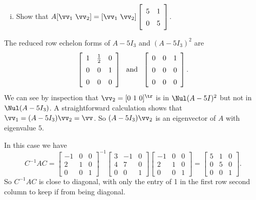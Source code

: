 \begin{pa}
\begin{enumerate}[i.]
	\item Show that $A[\vv_1 \ \vv_2] = [\vv_1 \ \vv_2] \left[ \begin{array}{cc} 5&1 \\ 0&5   \end{array} \right]$.
	
	\end{enumerate}
	

\ea

\end{pa}

\ActivitySolution
\ba
\item The reduced row echelon forms of $A - 5I_3$ and $(A-5I_3)^2$ are 
\[\left[\renewcommand{\arraystretch}{1.4} \begin{array}{ccc} 1&\frac{1}{2}&0 \\ 0&0&1 \\ 0&0&0 \end{array} \right] \ \text{ and } \ \left[ \begin{array}{ccc} 0&0&1 \\ 0&0&0 \\ 0&0&0 \end{array} \right].\]
We can see by inspection that $\vv_2 = [0 \ 1 \ 0]^{\tr}$ is in $\Nul (A-5 I)^2$ but not in $\Nul (A-5I_3)$. A straightforward calculation shows that $\vv_1 = (A-5I_3) \vv_2 = \vv$.  So $(A-5I_3) \vv_2$ is an eigenvector of $A$ with eigenvalue $5$. 

\item In this case we have 
\[C^{-1}AC = \left[ \begin{array}{rcc} -1&0&0\\2&1&0\\0&0&1 \end{array} \right]^{-1}  \left[ \begin{array}{crc} 3 &-1&0 \\ 4 & 7&0 \\ 0&0&1 \end{array} \right] \left[ \begin{array}{rcc} -1&0&0\\2&1&0\\0&0&1 \end{array} \right]  = \left[ \begin{array}{ccc} 5&1&0\\0&5&0 \\ 0&0&1 \end{array} \right].\]
So $C^{-1}AC$ is close to diagonal, with only the entry of 1 in the first row second column to keep if from being diagonal. 

